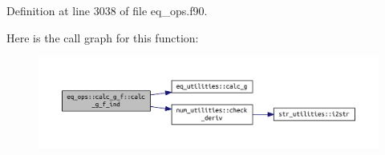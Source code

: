 Definition at line 3038 of file eq\+\_\+ops.\+f90.

Here is the call graph for this function\+:\nopagebreak
\begin{figure}[H]
\begin{center}
\leavevmode
\includegraphics[width=350pt]{interfaceeq__ops_1_1calc__g__f_a2c6ba8f85bc6ab16e69d4ec2ccaa317a_cgraph}
\end{center}
\end{figure}


